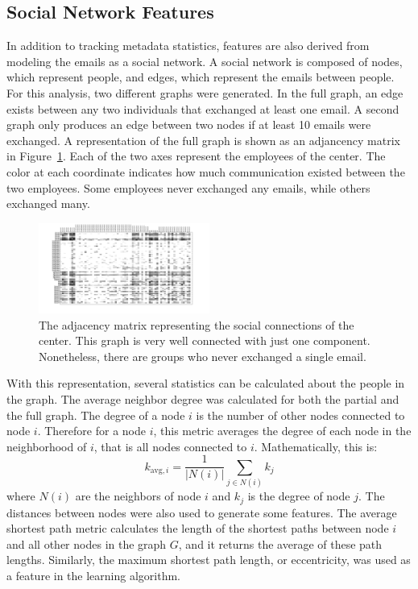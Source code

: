 \documentclass{article}
\begin{document}
\subsection{Social Network Features}
In addition to tracking metadata statistics, features are also derived from modeling the emails as a social network.  A social network is composed of nodes, which represent people, and edges, which represent the emails between people.  For this analysis, two different graphs were generated.  In the full graph, an edge exists between any two individuals that exchanged at least one email.  A second graph only produces an edge between two nodes if at least 10 emails were exchanged.  A representation of the full graph is shown as an adjancency matrix in Figure~\ref{fig:adj_matrix}.  Each of the two axes represent the employees of the center.  The color at each coordinate indicates how much communication existed between the two employees.  Some employees never exchanged any emails, while others exchanged many.

\begin{figure}[H]
    \centering
        \includegraphics[width=0.5\textwidth]{adj_matrix}
        \caption{The adjacency matrix representing the social connections of the center.  This graph is very well connected with just one component.  Nonetheless, there are groups who never exchanged a single email.}
        \label{fig:adj_matrix}
\end{figure}

With this representation, several statistics can be calculated about the people in the graph.  The average neighbor degree was calculated for both the partial and the full graph.  The degree of a node $i$ is the number of other nodes connected to node $i$.  Therefore for a node $i$, this metric averages the degree of each node in the neighborhood of $i$, that is all nodes connected to $i$.  Mathematically, this is:
\begin{equation}
k_{\text{avg},i} = \frac{1}{|N(i)|}\sum_{j \in N(i)}k_j
\end{equation}
where $N(i)$ are the neighbors of node $i$ and $k_j$ is the degree of node $j$.
The distances between nodes were also used to generate some features.  The average shortest path metric calculates the length of the shortest paths between node $i$ and all other nodes in the graph $G$, and it returns the average of these path lengths.  Similarly, the maximum shortest path length, or eccentricity, was used as a feature in the learning algorithm.  
\end{document}
